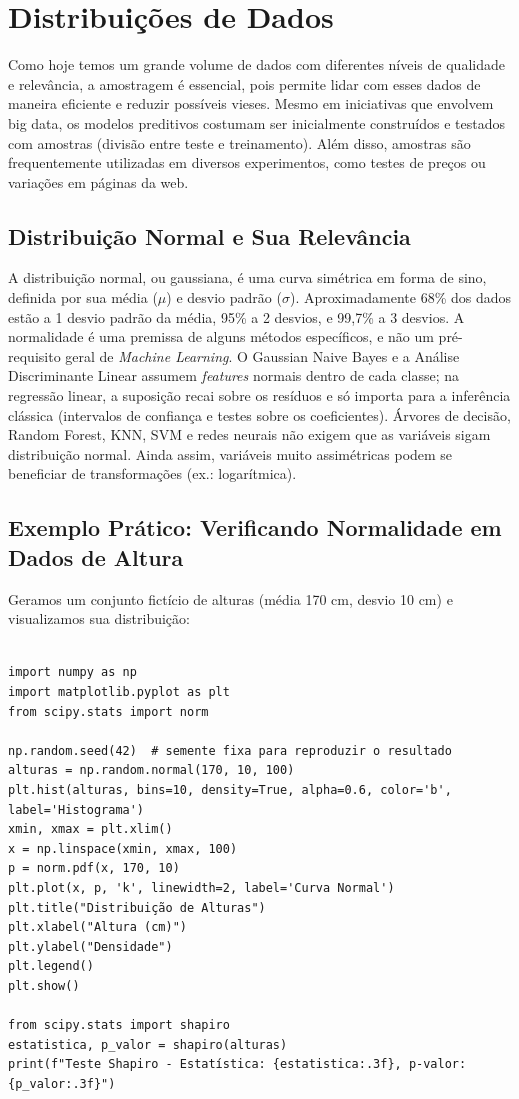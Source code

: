 \documentclass[a4paper,12pt,openany]{book}
\begin{document}
\section{Distribuições de Dados}
Como hoje temos um grande volume de dados com diferentes níveis de qualidade e relevância, a amostragem é essencial, pois permite lidar com esses dados de maneira eficiente e reduzir possíveis vieses. Mesmo em iniciativas que envolvem big data, os modelos preditivos costumam ser inicialmente construídos e testados com amostras (divisão entre teste e treinamento). Além disso, amostras são frequentemente utilizadas em diversos experimentos, como testes de preços ou variações em páginas da web.
\subsection{Distribuição Normal e Sua Relevância}
A distribuição normal, ou gaussiana, é uma curva simétrica em forma de sino, definida por sua média ($\mu$) e desvio padrão ($\sigma$). Aproximadamente 68\% dos dados estão a 1 desvio padrão da média, 95\% a 2 desvios, e 99,7\% a 3 desvios. A normalidade é uma premissa de alguns métodos específicos, e não um pré-requisito geral de \textit{Machine Learning}. O Gaussian Naive Bayes e a Análise Discriminante Linear assumem \textit{features} normais dentro de cada classe; na regressão linear, a suposição recai sobre os resíduos e só importa para a inferência clássica (intervalos de confiança e testes sobre os coeficientes). Árvores de decisão, Random Forest, KNN, SVM e redes neurais não exigem que as variáveis sigam distribuição normal. Ainda assim, variáveis muito assimétricas podem se beneficiar de transformações (ex.: logarítmica).

\subsection{Exemplo Prático: Verificando Normalidade em Dados de Altura}
Geramos um conjunto fictício de alturas (média 170 cm, desvio 10 cm) e visualizamos sua distribuição:

\begin{verbatim}
    
import numpy as np
import matplotlib.pyplot as plt
from scipy.stats import norm

np.random.seed(42)  # semente fixa para reproduzir o resultado
alturas = np.random.normal(170, 10, 100)
plt.hist(alturas, bins=10, density=True, alpha=0.6, color='b', label='Histograma')
xmin, xmax = plt.xlim()
x = np.linspace(xmin, xmax, 100)
p = norm.pdf(x, 170, 10)
plt.plot(x, p, 'k', linewidth=2, label='Curva Normal')
plt.title("Distribuição de Alturas")
plt.xlabel("Altura (cm)")
plt.ylabel("Densidade")
plt.legend()
plt.show()

from scipy.stats import shapiro
estatistica, p_valor = shapiro(alturas)
print(f"Teste Shapiro - Estatística: {estatistica:.3f}, p-valor: {p_valor:.3f}")
\end{verbatim}
\end{document}
